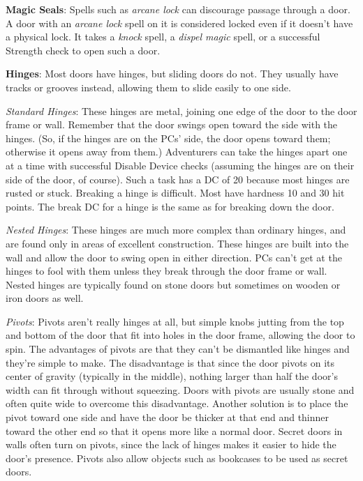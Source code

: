 \textbf{Magic Seals}: Spells such as \textit{arcane lock }can discourage passage through a door. A door with an \textit{arcane lock }spell on it is considered locked even if it doesn't have a physical lock. It takes a \textit{knock }spell, a \textit{dispel magic }spell, or a successful Strength check to open such a door.
				
\textbf{Hinges}: Most doors have hinges, but sliding doors do not. They usually have tracks or grooves instead, allowing them to slide easily to one side.
				
\textit{Standard Hinges}: These hinges are metal, joining one edge of the door to the door frame or wall. Remember that the door swings open toward the side with the hinges. (So, if the hinges are on the PCs' side, the door opens toward them; otherwise it opens away from them.) Adventurers can take the hinges apart one at a time with successful Disable Device checks (assuming the hinges are on their side of the door, of course). Such a task has a DC of 20 because most hinges are rusted or stuck. Breaking a hinge is difficult. Most have hardness 10 and 30 hit points. The break DC for a hinge is the same as for breaking down the door.
				
\textit{Nested Hinges}: These hinges are much more complex than ordinary hinges, and are found only in areas of excellent construction. These hinges are built into the wall and allow the door to swing open in either direction. PCs can't get at the hinges to fool with them unless they break through the door frame or wall. Nested hinges are typically found on stone doors but sometimes on wooden or iron doors as well. 
				
\textit{Pivots}: Pivots aren't really hinges at all, but simple knobs jutting from the top and bottom of the door that fit into holes in the door frame, allowing the door to spin. The advantages of pivots are that they can't be dismantled like hinges and they're simple to make. The disadvantage is that since the door pivots on its center of gravity (typically in the middle), nothing larger than half the door's width can fit through without squeezing. Doors with pivots are usually stone and often quite wide to overcome this disadvantage. Another solution is to place the pivot toward one side and have the door be thicker at that end and thinner toward the other end so that it opens more like a normal door. Secret doors in walls often turn on pivots, since the lack of hinges makes it easier to hide the door's presence. Pivots also allow objects such as bookcases to be used as secret doors.
				
